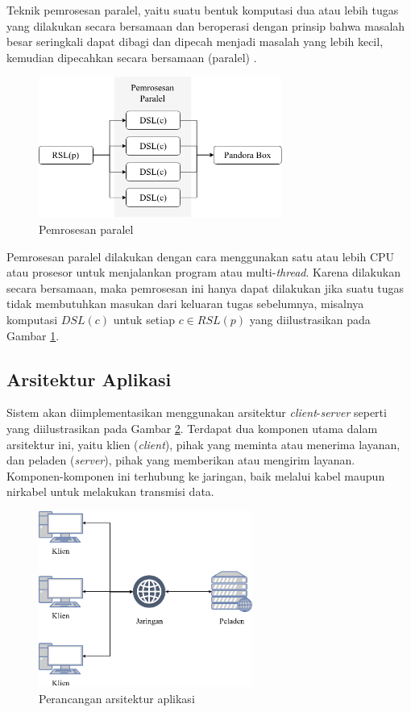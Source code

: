 Teknik pemrosesan paralel, yaitu suatu bentuk komputasi dua atau lebih tugas yang dilakukan secara bersamaan dan beroperasi dengan prinsip bahwa masalah besar seringkali dapat dibagi dan dipecah menjadi masalah yang lebih kecil, kemudian dipecahkan secara bersamaan (paralel) \cite{paralel}. 

\begin{figure}[h]
	\centering
	\includegraphics[width=8cm]{assets/img/bab3/paralel.png}
	\caption{Pemrosesan paralel}
	\label{fig:paralel}
\end{figure}

Pemrosesan paralel dilakukan dengan cara menggunakan satu atau lebih CPU atau prosesor untuk menjalankan program atau multi-\textit{thread}. Karena dilakukan secara bersamaan, maka pemrosesan ini hanya dapat dilakukan jika suatu tugas tidak membutuhkan masukan dari keluaran tugas sebelumnya, misalnya komputasi $DSL(c)$ untuk setiap $c \in RSL(p)$ yang diilustrasikan pada Gambar \ref{fig:paralel}.

\subsection{Arsitektur Aplikasi} 
\tab Sistem akan diimplementasikan menggunakan arsitektur \textit{client}-\textit{server} seperti yang diilustrasikan pada Gambar \ref{fig:arsitektur}. Terdapat dua komponen utama dalam arsitektur ini, yaitu klien (\textit{client}), pihak yang meminta atau menerima layanan, dan peladen (\textit{server}), pihak yang memberikan atau mengirim layanan. Komponen-komponen ini terhubung ke jaringan, baik melalui kabel maupun nirkabel untuk melakukan transmisi data. 

\begin{figure}[h]
	\centering
	\includegraphics[width=7cm]{assets/img/bab3/arsitektur.png}
	\caption{Perancangan arsitektur aplikasi}
	\label{fig:arsitektur}
\end{figure}

